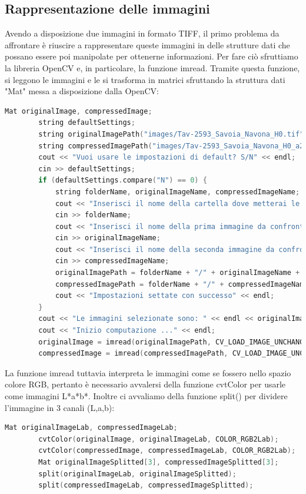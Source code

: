 \documentclass[a4paper,11pt]{article}
\begin{document}
    \subsection{Rappresentazione delle immagini}
    Avendo a disposizione due immagini in formato TIFF, il primo problema da affrontare è riuscire a rappresentare queste immagini in delle strutture dati che possano essere poi manipolate per ottenerne informazioni.
    Per fare ciò sfruttiamo la libreria OpenCV e, in particolare, la funzione imread. Tramite questa funzione, si leggono le immagini e le si trasforma in matrici sfruttando la struttura dati "Mat" messa a disposizione dalla OpenCV:
 
    \begin{lstlisting}[language=C++]
        Mat originalImage, compressedImage;
        string defaultSettings;
        string originalImagePath("images/Tav-2593_Savoia_Navona_H0.tif");
        string compressedImagePath("images/Tav-2593_Savoia_Navona_H0_a2.tif");
        cout << "Vuoi usare le impostazioni di default? S/N" << endl;
        cin >> defaultSettings;
        if (defaultSettings.compare("N") == 0) {
            string folderName, originalImageName, compressedImageName;
            cout << "Inserisci il nome della cartella dove metterai le immagini" << endl;
            cin >> folderName;
            cout << "Inserisci il nome della prima immagine da confrontare (senza formato)" << endl;
            cin >> originalImageName;
            cout << "Inserisci il nome della seconda immagine da confrontare (senza formato)" << endl;
            cin >> compressedImageName;
            originalImagePath = folderName + "/" + originalImageName + ".tif";
            compressedImagePath = folderName + "/" + compressedImageName + ".tif";
            cout << "Impostazioni settate con successo" << endl;
        }
        cout << "Le immagini selezionate sono: " << endl << originalImagePath << endl << compressedImagePath << endl;
        cout << "Inizio computazione ..." << endl;
        originalImage = imread(originalImagePath, CV_LOAD_IMAGE_UNCHANGED);
        compressedImage = imread(compressedImagePath, CV_LOAD_IMAGE_UNCHANGED);
    \end{lstlisting}
    \newpage
    La funzione imread tuttavia interpreta le immagini come se fossero nello spazio colore RGB, pertanto è necessario avvalersi della funzione cvtColor per usarle come immagini L*a*b*. 
    Inoltre ci avvaliamo della funzione split() per dividere l'immagine in 3 canali (L,a,b):
    \begin{lstlisting}[language=C++]
        Mat originalImageLab, compressedImageLab;
        cvtColor(originalImage, originalImageLab, COLOR_RGB2Lab);
        cvtColor(compressedImage, compressedImageLab, COLOR_RGB2Lab);
        Mat originalImageSplitted[3], compressedImageSplitted[3];
	    split(originalImageLab, originalImageSplitted);
	    split(compressedImageLab, compressedImageSplitted);
    \end{lstlisting}        
\end{document}
